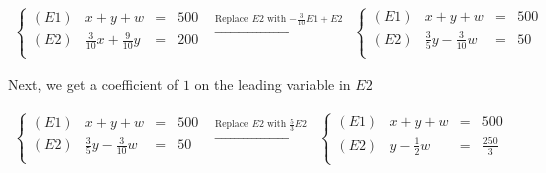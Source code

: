 \begin{ex}
\[\begin{array}{ccc}
\left\{ 

\begin{array}{lrcr}

(E1) & x+y+w & = & 500 \\  
(E2) & \frac{3}{10}x + \frac{9}{10}y & = & 200 \\    

\end{array} 

\right.

&

\xrightarrow{\text{Replace $E2$ with $-\frac{3}{10}E1 + E2$}}

&

\left\{ 

\begin{array}{lrcr}

(E1) & x+y+w & = & 500 \\  
(E2) &  \frac{3}{5}y - \frac{3}{10}w & = & 50 \\    

\end{array} 

\right.

\end{array}\]

Next, we get a coefficient of $1$ on the leading variable in $E2$

\[\begin{array}{ccc}


\left\{ 

\begin{array}{lrcr}

(E1) & x+y+w & = & 500 \\  
(E2) &  \frac{3}{5}y - \frac{3}{10}w & = & 50 \\    

\end{array} 

\right.

&

\xrightarrow{\text{Replace $E2$ with $\frac{5}{3}E2$}}

&


\left\{ 

\begin{array}{lrcr}

(E1) & x+y+w & = & 500 \\  
(E2) &  y - \frac{1}{2}w & = & \frac{250}{3} \\    

\end{array} 


\end{array}\]
\end{ex}
